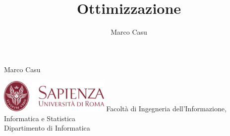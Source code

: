 \documentclass[10pt, letterpaper]{report}
\title{Ottimizzazione} %
\author{Marco Casu}
\date{\vspace{-5ex}}
\begin{document}
\begin{titlepage}
    
\begin{center}
   \HUGE Marco Casu\acc
    \HUGE \decothreeleft\hphantom{ }{\HUGE\selectfont Ottimizzazione}\hphantom{ }\decothreeright
\end{center}
\thispagestyle{empty}
\begin{figure}[h]
\end{figure}
\vfill 
\centering \includegraphics[width=0.4\textwidth ]{../../../preamble/Stemma_sapienza.png} \acc
\centering \Large \color{sapienza}Facoltà di Ingegneria dell'Informazione,
Informatica e Statistica\\
Dipartimento di Informatica
\end{titlepage}
\end{document}
